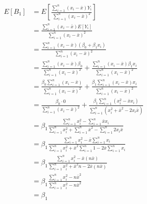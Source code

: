 \documentclass{article}
\begin{document}
\begin{align*}
    E[B_1] & = E\left[\frac{\sum_{i=1}^n (x_i - \bar{x}) Y_i}{\sum_{i=1}^n (x_i - \bar{x})^2}\right]                                                                         \\
           & = \frac{\sum_{i=1}^n (x_i - \bar{x}) E[Y_i]}{\sum_{i=1}^n (x_i - \bar{x})^2}                                                                                    \\
           & = \frac{\sum_{i=1}^n (x_i - \bar{x}) (\beta_0 + \beta_1 x_i)}{\sum_{i=1}^n (x_i - \bar{x})^2}                                                                   \\
           & = \frac{\sum_{i=1}^n (x_i - \bar{x}) \beta_0}{\sum_{i=1}^n (x_i - \bar{x})^2} + \frac{\sum_{i=1}^n (x_i - \bar{x}) \beta_1 x_i}{\sum_{i=1}^n (x_i - \bar{x})^2} \\
           & = \frac{\beta_0 \sum_{i=1}^n (x_i - \bar{x})}{\sum_{i=1}^n (x_i - \bar{x})^2} + \frac{\beta_1 \sum_{i=1}^n (x_i - \bar{x}) x_i}{\sum_{i=1}^n (x_i - \bar{x})^2} \\
           & = \frac{\beta_0 \cdot 0}{\sum_{i=1}^n (x_i - \bar{x})^2} + \frac{\beta_1 \sum_{i=1}^n (x_i^2 - \bar{x} x_i)}{\sum_{i=1}^n (x_i^2 + \bar{x}^2 - 2x_i\bar{x})}    \\
           & = \beta_1 \frac{\sum_{i=1}^n x_i^2 - \sum_{i=1}^n \bar{x} x_i}{\sum_{i=1}^n x_i^2 + \sum_{i=1}^n \bar{x}^2 - \sum_{i=1}^n 2x_i\bar{x}}                          \\
           & = \beta_1 \frac{\sum_{i=1}^n x_i^2 - \bar{x} \sum_{i=1}^n x_i}{\sum_{i=1}^n x_i^2 + \bar{x}^2 \sum_{i=1}^n 1 - 2\bar{x} \sum_{i=1}^n x_i}                       \\
           & = \beta_1 \frac{\sum_{i=1}^n x_i^2 - \bar{x} (n\bar{x})}{\sum_{i=1}^n x_i^2 + \bar{x}^2 n - 2\bar{x} (n\bar{x})}                                                \\
           & = \beta_1 \frac{\sum_{i=1}^n x_i^2 - n \bar{x}^2}{\sum_{i=1}^n x_i^2  - n \bar{x}^2}                                                                            \\
           & = \beta_1
\end{align*}
\end{document}
